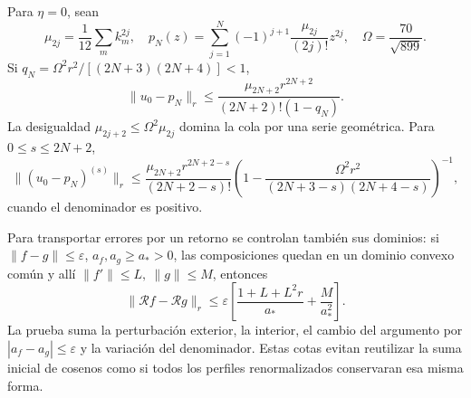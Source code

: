 Para \(\eta=0\), sean
\[
\mu_{2j}=\frac1{12}\sum_mk_m^{2j},\quad
p_N(z)=\sum_{j=1}^N(-1)^{j+1}\frac{\mu_{2j}}{(2j)!}z^{2j},
\quad\Omega=\frac{70}{\sqrt{899}}.
\]
Si \(q_N=\Omega^2r^2/[(2N+3)(2N+4)]<1\),
\[
\|u_0-p_N\|_r\le
\frac{\mu_{2N+2}r^{2N+2}}{(2N+2)!(1-q_N)}.
\]
La desigualdad \(\mu_{2j+2}\le\Omega^2\mu_{2j}\) domina la cola por una serie geométrica. Para \(0\le s\le2N+2\),
\[
\|(u_0-p_N)^{(s)}\|_r\le
\frac{\mu_{2N+2}r^{2N+2-s}}{(2N+2-s)!}
\left(1-\frac{\Omega^2r^2}{(2N+3-s)(2N+4-s)}\right)^{-1},
\]
cuando el denominador es positivo.

Para transportar errores por un retorno se controlan también sus dominios: si \(\|f-g\|\le\varepsilon\), \(a_f,a_g\ge a_*>0\), las composiciones quedan en un dominio convexo común y allí \(\|f'\|\le L,\ \|g\|\le M\), entonces
\[
\|\mathcal Rf-\mathcal Rg\|_r
\le\varepsilon\left[\frac{1+L+L^2r}{a_*}+\frac{M}{a_*^2}\right].
\]
La prueba suma la perturbación exterior, la interior, el cambio del argumento por \(|a_f-a_g|\le\varepsilon\) y la variación del denominador. Estas cotas evitan reutilizar la suma inicial de cosenos como si todos los perfiles renormalizados conservaran esa misma forma.
